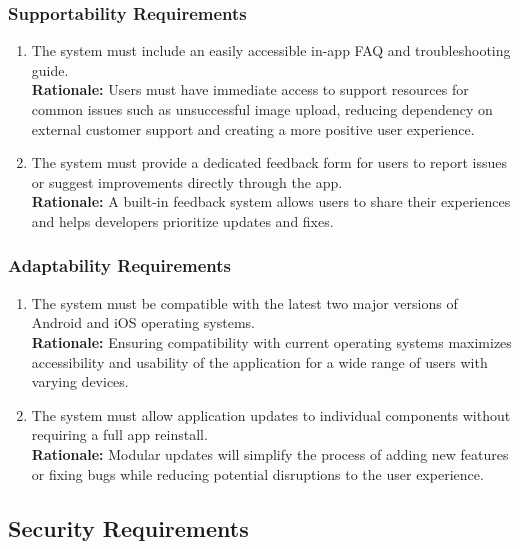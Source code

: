 \documentclass[]{article}
\begin{document}
\subsubsection{Supportability Requirements}
\label{ssub:supportability_requirements}
\begin{enumerate}[{MS-S}1. ]
	\item The system must include an easily accessible in-app FAQ and troubleshooting guide. \\
    \textbf{Rationale: }Users must have immediate access to support resources for common issues such as unsuccessful image upload,   reducing dependency on external customer support and creating a more positive user experience.
	\item The system must provide a dedicated feedback form for users to report issues or suggest improvements directly through the app. \\
    \textbf{Rationale:} A built-in feedback system allows users to share their experiences and helps developers prioritize updates and fixes.
\end{enumerate}

\subsubsection{Adaptability Requirements}
\label{ssub:adaptability_requirements}
\begin{enumerate}[{MS-A}1. ]
	\item The system must be compatible with the latest two major versions of Android and iOS operating systems. \\
	\textbf{Rationale:} Ensuring compatibility with current operating systems maximizes accessibility and usability of the application for a wide range of users with varying devices.
	\item The system must allow application updates to individual components without requiring a full app reinstall. \\
	\textbf{Rationale:} Modular updates will simplify the process of adding new features or fixing bugs while reducing potential disruptions to the user experience.
\end{enumerate}


\subsection{Security Requirements}
\label{sub:security_requirements}
\end{document}
